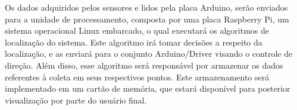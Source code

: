 \vfill
\pagebreak

Os dados adquiridos pelos sensores e lidos pela placa Arduino, serão enviados para a unidade de processamento, composta por
uma placa Raspberry Pi, um sistema operacional Linux embarcado, o qual executará os algoritmos de localização do sistema. Este
algoritmo irá tomar decisões a respeito da localização, e as enviará para o conjunto Arduino/Driver visando o controle de
direção. Além disso, esse algoritmo será responsável por armazenar os dados referentes à coleta em seus respectivos
pontos. Este armazenamento será implementado em um cartão de memória, que estará disponível para posterior visualização por
parte do usuário final.
